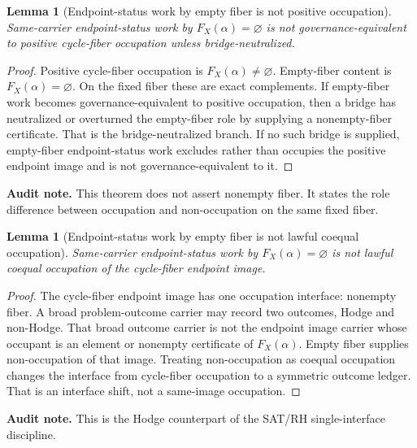 \documentclass[11pt]{article}
\newtheorem{lemma}[theorem]{Lemma}
\begin{document}
\begin{lemma}[Endpoint-status work by empty fiber is not positive occupation]
Same-carrier endpoint-status work by $F_X(\alpha)=\varnothing$ is not governance-equivalent to positive cycle-fiber occupation unless bridge-neutralized.
\end{lemma}
\begin{proof}
Positive cycle-fiber occupation is $F_X(\alpha)\neq\varnothing$. Empty-fiber content is $F_X(\alpha)=\varnothing$. On the fixed fiber these are exact complements. If empty-fiber work becomes governance-equivalent to positive occupation, then a bridge has neutralized or overturned the empty-fiber role by supplying a nonempty-fiber certificate. That is the bridge-neutralized branch. If no such bridge is supplied, empty-fiber endpoint-status work excludes rather than occupies the positive endpoint image and is not governance-equivalent to it.
\end{proof}
\par\noindent\textbf{Audit note.} This theorem does not assert nonempty fiber. It states the role difference between occupation and non-occupation on the same fixed fiber.

\begin{lemma}[Endpoint-status work by empty fiber is not lawful coequal occupation]
Same-carrier endpoint-status work by $F_X(\alpha)=\varnothing$ is not lawful coequal occupation of the cycle-fiber endpoint image.
\end{lemma}
\begin{proof}
The cycle-fiber endpoint image has one occupation interface: nonempty fiber. A broad problem-outcome carrier may record two outcomes, Hodge and non-Hodge. That broad outcome carrier is not the endpoint image carrier whose occupant is an element or nonempty certificate of $F_X(\alpha)$. Empty fiber supplies non-occupation of that image. Treating non-occupation as coequal occupation changes the interface from cycle-fiber occupation to a symmetric outcome ledger. That is an interface shift, not a same-image occupation.
\end{proof}
\par\noindent\textbf{Audit note.} This is the Hodge counterpart of the SAT/RH single-interface discipline.
\end{document}
